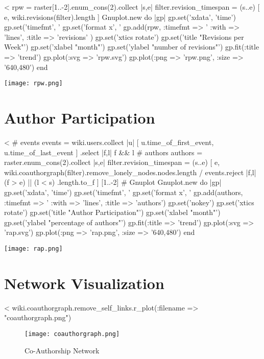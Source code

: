 \documentclass{scrartcl}
\begin{document}
<%
rpw = raster[1..-2].enum_cons(2).collect { |s,e| 
	filter.revision_timespan = (s..e)
	[ e, wiki.revisions(filter).length ]
	}
Gnuplot.new do |gp|
	gp.set('xdata', 'time')
	gp.set('timefmt', '%
	gp.set('format x', '%
	gp.add(rpw, :timefmt => '%
		:with => 'lines', 
		:title => 'revisions' )
	gp.set('xtics rotate')
	gp.set('title "Revisions per Week"')
	gp.set('xlabel "month"')
	gp.set('ylabel "number of revisions"')
	gp.fit(:title => 'trend')
	gp.plot(:svg => 'rpw.svg')
	gp.plot(:png => 'rpw.png', :size => '640,480')
end
\begin{center}
  \texttt{[image: rpw.png]}
\end{center}


\section{Author Participation} %
\label{sec:author_participation}

<%
# events
events = wiki.users.collect{ |u| 
	[ u.time_of_first_event, u.time_of_last_event ] 
    }.select { |f,l| f && l }
# authors
authors = raster.enum_cons(2).collect { |s,e|
	filter.revision_timespan = (s..e)
	[ e,
    	wiki.coauthorgraph(filter).remove_lonely_nodes.nodes.length /
        events.reject { |f,l| (f > e) || (l < s) }.length.to_f ]
	}[1..-2]
# Gnuplot
Gnuplot.new do |gp|
	gp.set('xdata', 'time')
	gp.set('timefmt', '%
	gp.set('format x', '%
	gp.add(authors, :timefmt => '%
		:with => 'lines',
		:title => 'authors')
	gp.set('nokey')
	gp.set('xtics rotate')
	gp.set('title "Author Participation"')
	gp.set('xlabel "month"')
	gp.set('ylabel "percentage of authors"')
	gp.fit(:title => 'trend')
	gp.plot(:svg => 'rap.svg')
	gp.plot(:png => 'rap.png', :size => '640,480')
end
\begin{center}
  \texttt{[image: rap.png]}
\end{center}


\section{Network Visualization} %
\label{sec:network_visualization}

<%
wiki.coauthorgraph.remove_self_links.r_plot(:filename => "coauthorgraph.png")
\begin{figure}
	\centering
	\texttt{[image: coauthorgraph.png]}
	\caption{Co-Authorship Network}
	\label{fig:co-authorship_network}
\end{figure}
\end{document}
